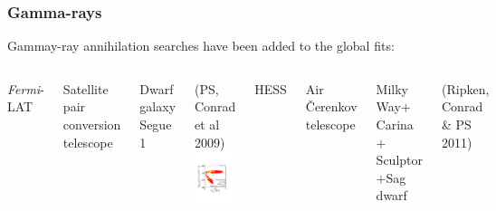 \documentclass[xcolor=dvipsnames]{beamer}
\newcommand{\cblue}[1]{{\color[rgb]{0.1, 0.0, 0.6} #1}}
\begin{document}
\begin{frame}
\frametitle{Gamma-rays}

Gammay-ray annihilation searches have been added to the global fits: 
\vspace{3mm}

\begin{columns}[t]

\cblue{\textit{Fermi}-LAT}

{\footnotesize
Satellite pair conversion telescope

Dwarf galaxy Segue 1

(PS, Conrad et al 2009)
\includegraphics[width=0.9\textwidth, trim = 0 0 0 200, clip=true]{B50_H0_All_P_lin_2D_profl_7}
}

\cblue{HESS}

{\footnotesize
Air \v{C}erenkov telescope

Milky Way$+$Carina$+$Sculptor$+$Sag dwarf

(Ripken, Conrad \& PS 2011)\vspace{2mm}

}
\end{columns}
\end{frame}
\end{document}
